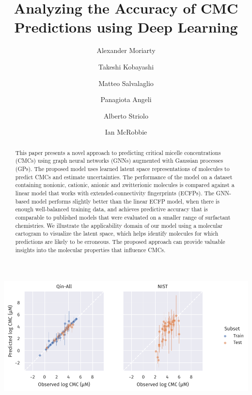 \documentclass[journal=jcisd8,manuscript=article]{achemso}
\author{Alexander Moriarty}
\author{Takeshi Kobayashi}
\author{Matteo Salvalaglio}
\author{Panagiota Angeli}
\author{Alberto Striolo}
\affiliation[UCL]{Department of Chemical Engineering, University College London, UK}
\author{Ian McRobbie}
\affiliation[Innospec]{Innospec Ltd., Ellesmere Port, UK}
\title{Analyzing the Accuracy of CMC Predictions using Deep Learning}
\begin{document}
\begin{tocentry}
    \includegraphics[width=\textwidth]{images/uq-parity.pdf}
\end{tocentry}

\begin{abstract}
    This paper presents a novel approach to predicting critical micelle
    concentrations (CMCs) using graph neural networks (GNNs) augmented with
    Gaussian processes (GPs). The proposed model uses learned latent space
    representations of molecules to predict CMCs and estimate uncertainties. The
    performance of the model on a dataset containing nonionic, cationic, anionic
    and zwitterionic molecules is compared against a linear model that works
    with extended-connectivity fingerprints (ECFPs). The GNN-based model
    performs slightly better than the linear ECFP model, when there is enough
    well-balanced training data, and achieves predictive accuracy that is
    comparable to published models that were evaluated on a smaller range of
    surfactant chemistries. We illustrate the applicability domain of our model
    using a molecular cartogram to visualize the latent space, which helps
    identify molecules for which predictions are likely to be erroneous. The
    proposed approach can provide valuable insights into the molecular
    properties that influence CMCs.
\end{abstract}
\end{document}

